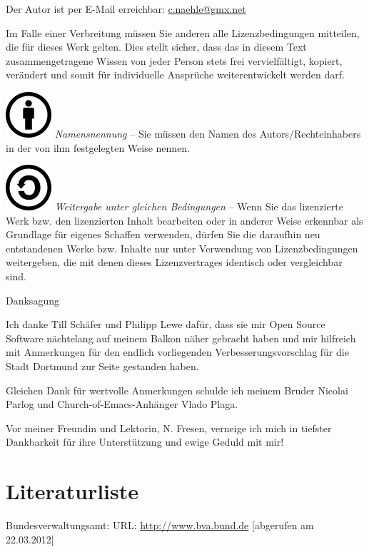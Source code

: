 \documentclass[a4paper]{scrartcl}
\begin{document}
Der Autor ist per E-Mail erreichbar:
\href{mailto:c.naehle@gmx.net}{c.naehle@gmx.net}

Im Falle einer Verbreitung müssen Sie anderen alle Lizenzbedingungen mitteilen,
die für dieses Werk gelten. Dies stellt sicher, dass das in diesem Text
zusammengetragene Wissen von jeder Person stets frei vervielfältigt, kopiert,
verändert und somit für individuelle Ansprüche weiterentwickelt werden darf.

\includegraphics[width=0.6665in,height=0.6665in]{freiesoftwaredortmund-img4.png}
\emph{Namensnennung} -- Sie müssen den Namen des
Autors/Rechteinhabers in der von ihm festgelegten Weise nennen.

\includegraphics[width=0.6665in,height=0.6665in]{freiesoftwaredortmund-img5.png}
\emph{Weitergabe unter gleichen Bedingungen} -- Wenn
Sie das lizenzierte Werk bzw. den lizenzierten Inhalt bearbeiten oder
in anderer Weise erkennbar als Grundlage für eigenes Schaffen
verwenden, dürfen Sie die daraufhin neu entstandenen Werke bzw.
Inhalte nur unter Verwendung von Lizenzbedingungen weitergeben, die mit
denen dieses Lizenzvertrages identisch oder vergleichbar sind.

Danksagung

Ich danke Till Schäfer und Philipp Lewe dafür, dass sie mir Open Source Software
nächtelang auf meinem Balkon näher gebracht haben und mir hilfreich mit
Anmerkungen für den endlich vorliegenden Verbesserungsvorschlag für die Stadt
Dortmund zur Seite gestanden haben.

Gleichen Dank für wertvolle Anmerkungen schulde ich meinem Bruder Nicolai Parlog
und Church-of-Emacs-Anhänger Vlado Plaga.

Vor meiner Freundin und Lektorin, N. Fresen, verneige ich mich in tiefster
Dankbarkeit für ihre Unterstützung und ewige Geduld mit mir!

\section{Literaturliste}

{
{{Bundesverwaltungsamt: URL:
}}\href{http://www.bva.bund.de/}{{http://www.bva.bund.de}}
[abgerufen{{ am 22.03.2012]}}}
\end{document}
